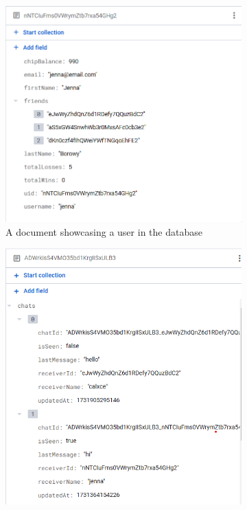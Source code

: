  \begin{figure}[b]
    \centering
    \begin{subfigure}[b]{0.45\textwidth} 
        \centering
        \includegraphics[width=\textwidth]{figures/DB Screenshot user.png}
        \caption{A document showcasing a user in the database}
        \label{fig:userDB}
    \end{subfigure}
    \hfill 
    \begin{subfigure}[b]{0.45\textwidth}
        \centering
        \includegraphics[width=\textwidth]{figures/DB Screenshot userChats.png}

\end{subfigure}
\end{figure}
